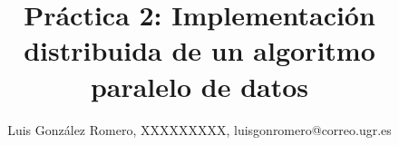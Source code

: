 \author{Luis González Romero, XXXXXXXXX, luisgonromero@correo.ugr.es}
\title{Práctica 2: Implementación distribuida de un
algoritmo paralelo de datos}
\newcommand{\grupopracticas}{Grupo 1: Miércoles 09:30-11:30}
\newcommand{\subtitulo}{Subtítulo}
\newcommand{\curso}{Programación Paralela}
\newcommand{\departamento}{Lenguajes y Sistemas Informáticos}